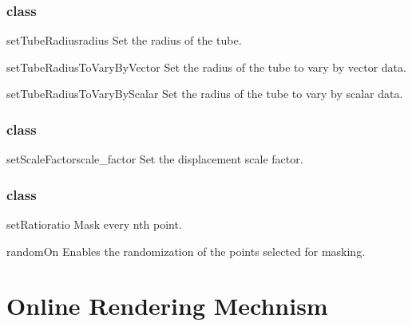 \subsubsection{\Tube class}

\begin{methoddesc}[Tube]{setTubeRadius}{radius}
Set the radius of the tube.
\end{methoddesc}

\begin{methoddesc}[Tube]{setTubeRadiusToVaryByVector}{}
Set the radius of the tube to vary by vector data.
\end{methoddesc}

\begin{methoddesc}[Tube]{setTubeRadiusToVaryByScalar}{}
Set the radius of the tube to vary by scalar data.
\end{methoddesc}

\subsubsection{\Warp class}

\begin{methoddesc}[Warp]{setScaleFactor}{scale_factor}
Set the displacement scale factor.
\end{methoddesc}

\subsubsection{\MaskPoints class}

\begin{methoddesc}[MaskPoints]{setRatio}{ratio}
Mask every nth point.
\end{methoddesc}

\begin{methoddesc}[MaskPoints]{randomOn}{}
Enables the randomization of the points selected for masking.
\end{methoddesc}

\section{Online Rendering Mechnism}









